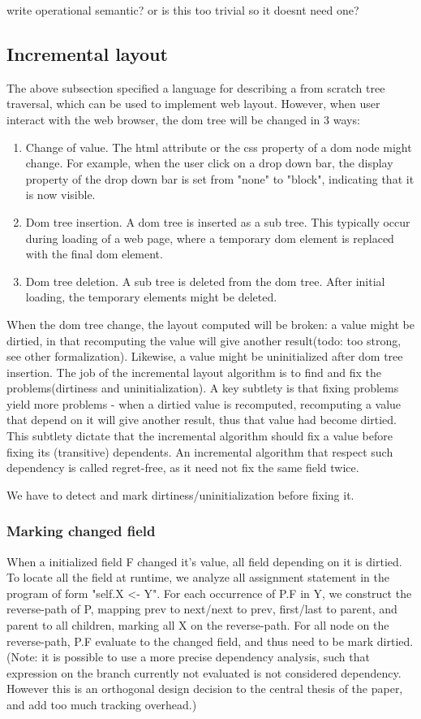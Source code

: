 \documentclass[format=acmsmall, review=false, screen=true]{acmart}
\begin{document}
write operational semantic? or is this too trivial so it doesnt need one?

\subsection{Incremental layout}
The above subsection specified a language for describing a from scratch tree traversal, which can be used to implement web layout. However, when user interact with the web browser, the dom tree will be changed in 3 ways:
\begin{enumerate}
	\item Change of value. The html attribute or the css property of a dom node might change. For example, when the user click on a drop down bar, the display property of the drop down bar is set from "none" to "block", indicating that it is now visible.
	\item Dom tree insertion. A dom tree is inserted as a sub tree. This typically occur during loading of a web page, where a temporary dom element is replaced with the final dom element.
	\item Dom tree deletion. A sub tree is deleted from the dom tree. After initial loading, the temporary elements might be deleted.
\end{enumerate}

When the dom tree change, the layout computed will be broken: a value might be dirtied, in that recomputing the value will give another result(todo: too strong, see other formalization). Likewise, a value might be uninitialized after dom tree insertion. The job of the incremental layout algorithm is to find and fix the problems(dirtiness and uninitialization). A key subtlety is that fixing problems yield more problems - when a dirtied value is recomputed, recomputing a value that depend on it will give another result, thus that value had become dirtied. This subtlety dictate that the incremental algorithm should fix a value before fixing its (transitive) dependents. An incremental algorithm that respect such dependency is called regret-free, as it need not fix the same field twice.

We have to detect and mark dirtiness/uninitialization before fixing it.

\subsubsection{Marking changed field}
When a initialized field F changed it's value, all field depending on it is dirtied. To locate all the field at runtime, we analyze all assignment statement in the program of form "self.X <- Y". For each occurrence of P.F in Y, we construct the reverse-path of P, mapping prev to next/next to prev, first/last to parent, and parent to all children, marking all X on the reverse-path. For all node on the reverse-path, P.F evaluate to the changed field, and thus need to be mark dirtied. (Note: it is possible to use a more precise dependency analysis, such that expression on the branch currently not evaluated is not considered dependency. However this is an orthogonal design decision to the central thesis of the paper, and add too much tracking overhead.)
\end{document}
